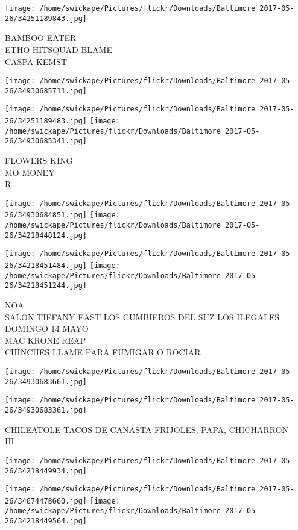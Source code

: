 \documentclass[10pt,letterpaper]{article}
\begin{document}
\texttt{[image: /home/swickape/Pictures/flickr/Downloads/Baltimore 2017-05-26/34251189843.jpg]}

BAMBOO EATER\\
ETHO HITSQUAD BLAME\\
CASPA KEMST
\pagebreak

\texttt{[image: /home/swickape/Pictures/flickr/Downloads/Baltimore 2017-05-26/34930685711.jpg]}

\vspace{0.25in}
\texttt{[image: /home/swickape/Pictures/flickr/Downloads/Baltimore 2017-05-26/34251189483.jpg]}
\texttt{[image: /home/swickape/Pictures/flickr/Downloads/Baltimore 2017-05-26/34930685341.jpg]}

FLOWERS KING\\
MO MONEY\\
R
\pagebreak

\texttt{[image: /home/swickape/Pictures/flickr/Downloads/Baltimore 2017-05-26/34930684851.jpg]}
\texttt{[image: /home/swickape/Pictures/flickr/Downloads/Baltimore 2017-05-26/34218448124.jpg]}

\texttt{[image: /home/swickape/Pictures/flickr/Downloads/Baltimore 2017-05-26/34218451484.jpg]}
\texttt{[image: /home/swickape/Pictures/flickr/Downloads/Baltimore 2017-05-26/34218451244.jpg]}

NOA\\
SALON TIFFANY EAST LOS CUMBIEROS DEL SUZ LOS ILEGALES DOMINGO 14 MAYO\\
MAC KRONE REAP\\
CHINCHES LLAME PARA FUMIGAR O ROCIAR
\pagebreak

\texttt{[image: /home/swickape/Pictures/flickr/Downloads/Baltimore 2017-05-26/34930683661.jpg]}

\vspace{0.25in}
\texttt{[image: /home/swickape/Pictures/flickr/Downloads/Baltimore 2017-05-26/34930683361.jpg]}

CHILEATOLE TACOS DE CANASTA FRIJOLES, PAPA, CHICHARRON\\
HI
\pagebreak

\texttt{[image: /home/swickape/Pictures/flickr/Downloads/Baltimore 2017-05-26/34218449934.jpg]}

\vspace{0.25in}
\texttt{[image: /home/swickape/Pictures/flickr/Downloads/Baltimore 2017-05-26/34674478660.jpg]}
\texttt{[image: /home/swickape/Pictures/flickr/Downloads/Baltimore 2017-05-26/34218449564.jpg]}
\end{document}
